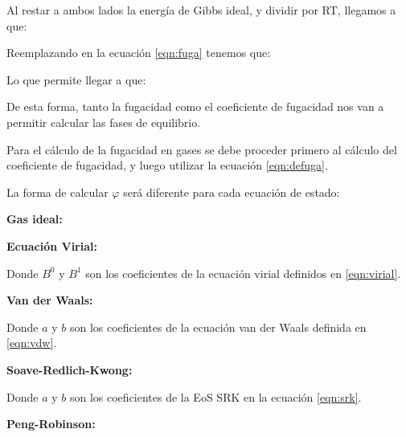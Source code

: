 
Al restar a ambos lados la energía de Gibbs ideal, y dividir por RT, llegamos a que:


Reemplazando en la ecuación \ref{eqn:fuga} tenemos que:


Lo que permite llegar a que:


De esta forma, tanto la fugacidad como el coeficiente de fugacidad nos van a permitir calcular las fases de equilibrio.


Para el cálculo de la fugacidad en gases se debe proceder primero al cálculo del coeficiente de fugacidad, y luego utilizar la ecuación \ref{eqn:defuga}.

La forma de calcular $\varphi$ será diferente para cada ecuación de estado:

\textbf{Gas ideal:}


\textbf{Ecuación Virial:}


Donde $B^0$ y $B^1$ son los coeficientes de la ecuación virial definidos en \ref{eqn:virial}.

\textbf{Van der Waals:}


Donde $a$ y $b$ son los coeficientes de la ecuación van der Waals definida en \ref{eqn:vdw}.

\textbf{Soave-Redlich-Kwong:}


Donde $a$ y $b$ son los coeficientes de la EoS SRK en la ecuación \ref{eqn:srk}.

\textbf{Peng-Robinson:}

